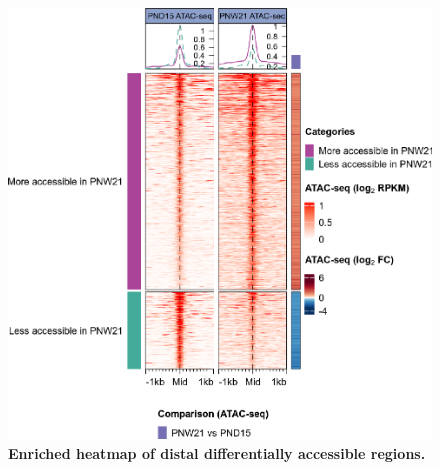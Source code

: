 \documentclass[12pt,twoside]{reedthesis}
\begin{document}
\begin{figure}[htbp]

{\centering \includegraphics{thesis_files/figure-latex/dn4-1} 

}

\caption[Enriched heatmap of distal DARs]{\textbf{Enriched heatmap of distal differentially accessible regions.}}\label{fig:dn4}
\end{figure}
\end{document}
